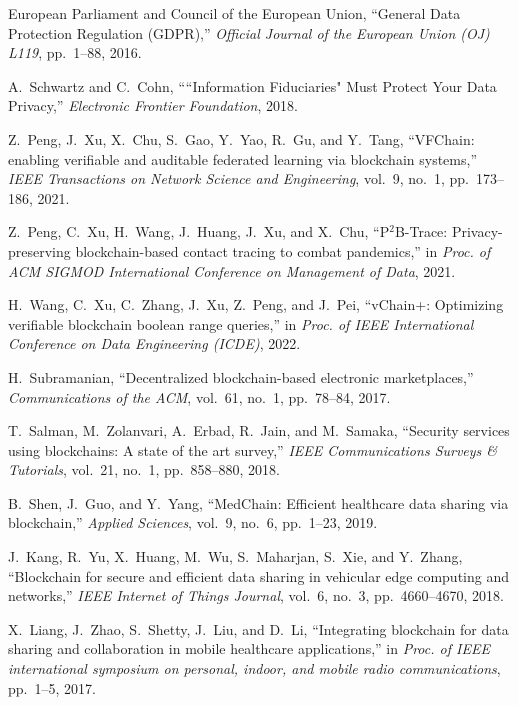 \documentclass[11pt,divpdfm]{article}
\begin{document}
\begin{thebibliography}{10}

{European Parliament and Council of the European Union}, ``{General Data
  Protection Regulation (GDPR)},'' {\em Official Journal of the European Union
  (OJ) L119}, pp.~1--88, 2016.

A.~Schwartz and C.~Cohn, ``{``Information Fiduciaries" Must Protect Your Data
  Privacy},'' {\em Electronic Frontier Foundation}, 2018.

Z.~Peng, J.~Xu, X.~Chu, S.~Gao, Y.~Yao, R.~Gu, and Y.~Tang, ``{VFChain}:
  enabling verifiable and auditable federated learning via blockchain
  systems,'' {\em IEEE Transactions on Network Science and Engineering},
  vol.~9, no.~1, pp.~173--186, 2021.

Z.~Peng, C.~Xu, H.~Wang, J.~Huang, J.~Xu, and X.~Chu, ``{P$^2$B-Trace}:
  Privacy-preserving blockchain-based contact tracing to combat pandemics,'' in
  {\em Proc. of ACM SIGMOD International Conference on Management of Data},
  2021.

H.~Wang, C.~Xu, C.~Zhang, J.~Xu, Z.~Peng, and J.~Pei, ``{vChain+}: Optimizing
  verifiable blockchain boolean range queries,'' in {\em Proc. of IEEE
  International Conference on Data Engineering (ICDE)}, 2022.

H.~Subramanian, ``Decentralized blockchain-based electronic marketplaces,''
  {\em Communications of the ACM}, vol.~61, no.~1, pp.~78--84, 2017.

T.~Salman, M.~Zolanvari, A.~Erbad, R.~Jain, and M.~Samaka, ``Security services
  using blockchains: A state of the art survey,'' {\em IEEE Communications
  Surveys \& Tutorials}, vol.~21, no.~1, pp.~858--880, 2018.

B.~Shen, J.~Guo, and Y.~Yang, ``{MedChain}: Efficient healthcare data sharing
  via blockchain,'' {\em Applied Sciences}, vol.~9, no.~6, pp.~1--23, 2019.

J.~Kang, R.~Yu, X.~Huang, M.~Wu, S.~Maharjan, S.~Xie, and Y.~Zhang,
  ``Blockchain for secure and efficient data sharing in vehicular edge
  computing and networks,'' {\em IEEE Internet of Things Journal}, vol.~6,
  no.~3, pp.~4660--4670, 2018.

X.~Liang, J.~Zhao, S.~Shetty, J.~Liu, and D.~Li, ``Integrating blockchain for
  data sharing and collaboration in mobile healthcare applications,'' in {\em
  Proc. of IEEE international symposium on personal, indoor, and mobile radio
  communications}, pp.~1--5, 2017.


\end{thebibliography}
\end{document}
